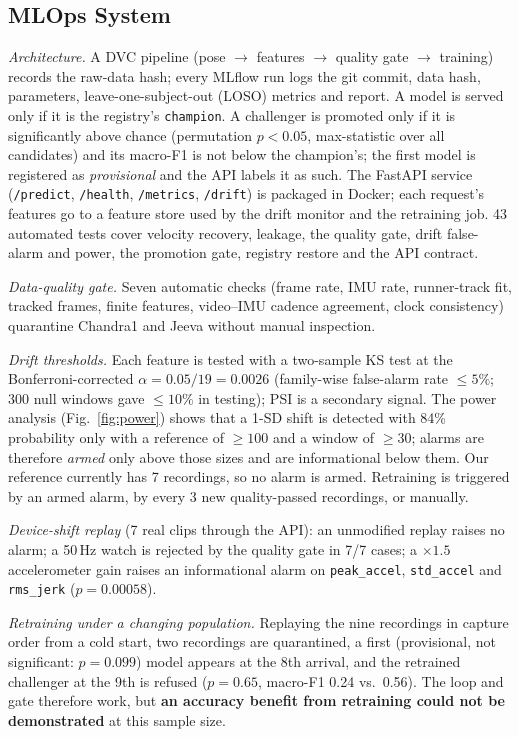 \subsection{MLOps System}
\emph{Architecture.} A DVC pipeline (pose $\rightarrow$ features $\rightarrow$ quality gate $\rightarrow$ training)
records the raw-data hash; every MLflow run logs the git commit, data hash, parameters, leave-one-subject-out (LOSO)
metrics and report. A model is served only if it is the registry's \texttt{champion}. A challenger is promoted only if
it is significantly above chance (permutation $p<0.05$, max-statistic over all candidates) and its macro-F1 is not below
the champion's; the first model is registered as \emph{provisional} and the API labels it as such. The FastAPI service
(\texttt{/predict}, \texttt{/health}, \texttt{/metrics}, \texttt{/drift}) is packaged in Docker; each request's features
go to a feature store used by the drift monitor and the retraining job. 43 automated tests cover velocity recovery,
leakage, the quality gate, drift false-alarm and power, the promotion gate, registry restore and the API contract.

\emph{Data-quality gate.} Seven automatic checks (frame rate, IMU rate, runner-track fit, tracked frames, finite features,
video--IMU cadence agreement, clock consistency) quarantine Chandra1 and Jeeva without manual inspection.

\emph{Drift thresholds.} Each feature is tested with a two-sample KS test at the Bonferroni-corrected
$\alpha=0.05/19=0.0026$ (family-wise false-alarm rate $\leq5\%$; 300 null windows gave $\leq10\%$ in testing); PSI is a
secondary signal. The power analysis (Fig.~\ref{fig:power}) shows that a 1-SD shift is detected with 84\% probability
only with a reference of $\geq100$ and a window of $\geq30$; alarms are therefore \emph{armed} only above those sizes
and are informational below them. Our reference currently has 7 recordings, so no alarm is armed.
Retraining is triggered by an armed alarm, by every 3 new quality-passed recordings, or manually.

\emph{Device-shift replay} (7 real clips through the API): an unmodified replay raises no alarm; a 50\,Hz watch is
rejected by the quality gate in 7/7 cases; a $\times1.5$ accelerometer gain raises an informational alarm on
\texttt{peak\_accel}, \texttt{std\_accel} and \texttt{rms\_jerk} ($p=0.00058$).

\emph{Retraining under a changing population.} Replaying the nine recordings in capture order from a cold start, two
recordings are quarantined, a first (provisional, not significant: $p=0.099$) model appears at the 8th arrival, and the
retrained challenger at the 9th is refused ($p=0.65$, macro-F1 0.24 vs.\ 0.56). The loop and gate therefore work, but
\textbf{an accuracy benefit from retraining could not be demonstrated} at this sample size.

